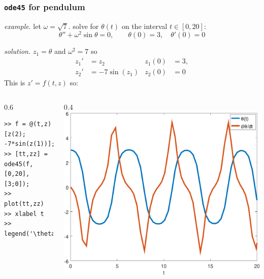\documentclass[urlcolor=blue,dvipsnames]{beamer}
\begin{document}
\begin{frame}[fragile]
\frametitle{\texttt{ode45} for pendulum}

\noindent \emph{example}.  let $\omega=\sqrt{7}$.  solve for $\theta(t)$ on the interval $t\in [0,20]$:
    $$\theta''+ \omega^2 \sin\theta = 0, \qquad \theta(0)=3, \quad \theta'(0)=0$$

\noindent \emph{solution.}  $z_1=\theta$ and $\omega^2=7$ so
\begin{align*}
z_1' &= z_2 & z_1(0)&=3, \\
z_2' &= - 7 \sin(z_1) & z_2(0)&=0
\end{align*}
This is $z'=f(t,z)$ so:

\begin{columns}
\begin{column}{0.6\textwidth}
\begin{Verbatim}[fontsize=\small]
>> f = @(t,z) [z(2); -7*sin(z(1))];
>> [tt,zz] = ode45(f,[0,20],[3;0]);
>> plot(tt,zz)
>> xlabel t
>> legend('\theta(t)','d\theta/dt')
\end{Verbatim}

\vspace{10mm}
\end{column}
\begin{column}{0.4\textwidth}
\includegraphics[width=\textwidth]{figs/pend-chunky}
\end{column}
\end{columns}
\end{frame}
\end{document}
